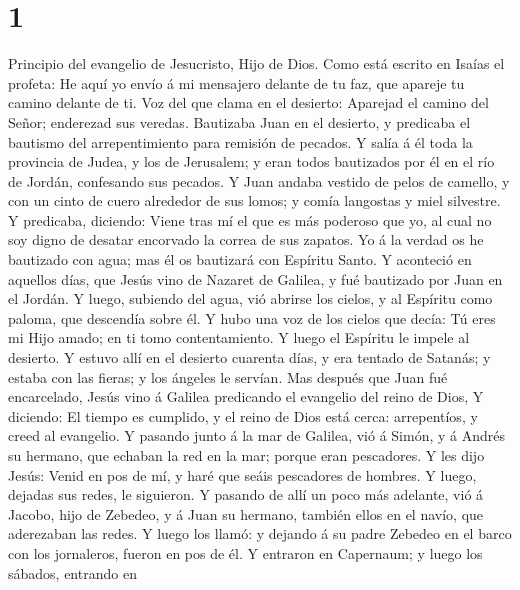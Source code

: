 \hypertarget{section}{%
\section{1}\label{section}}

 Principio del evangelio de Jesucristo, Hijo de Dios.
 Como está escrito en Isaías el profeta: He aquí yo envío á
mi mensajero delante de tu faz, que apareje tu camino delante de ti.
 Voz del que clama en el desierto: Aparejad el camino del
Señor; enderezad sus veredas.  Bautizaba Juan en el
desierto, y predicaba el bautismo del arrepentimiento para remisión de
pecados.  Y salía á él toda la provincia de Judea, y los de
Jerusalem; y eran todos bautizados por él en el río de Jordán,
confesando sus pecados.  Y Juan andaba vestido de pelos de
camello, y con un cinto de cuero alrededor de sus lomos; y comía
langostas y miel silvestre.  Y predicaba, diciendo: Viene
tras mí el que es más poderoso que yo, al cual no soy digno de desatar
encorvado la correa de sus zapatos.  Yo á la verdad os he
bautizado con agua; mas él os bautizará con Espíritu Santo. 
Y aconteció en aquellos días, que Jesús vino de Nazaret de Galilea, y
fué bautizado por Juan en el Jordán.  Y luego, subiendo del
agua, vió abrirse los cielos, y al Espíritu como paloma, que descendía
sobre él.  Y hubo una voz de los cielos que decía: Tú eres
mi Hijo amado; en ti tomo contentamiento.  Y luego el
Espíritu le impele al desierto.  Y estuvo allí en el
desierto cuarenta días, y era tentado de Satanás; y estaba con las
fieras; y los ángeles le servían.  Mas después que Juan fué
encarcelado, Jesús vino á Galilea predicando el evangelio del reino de
Dios,  Y diciendo: El tiempo es cumplido, y el reino de
Dios está cerca: arrepentíos, y creed al evangelio.  Y
pasando junto á la mar de Galilea, vió á Simón, y á Andrés su hermano,
que echaban la red en la mar; porque eran pescadores.  Y
les dijo Jesús: Venid en pos de mí, y haré que seáis pescadores de
hombres.  Y luego, dejadas sus redes, le siguieron.
 Y pasando de allí un poco más adelante, vió á Jacobo, hijo
de Zebedeo, y á Juan su hermano, también ellos en el navío, que
aderezaban las redes.  Y luego los llamó: y dejando á su
padre Zebedeo en el barco con los jornaleros, fueron en pos de él.
 Y entraron en Capernaum; y luego los sábados, entrando en
